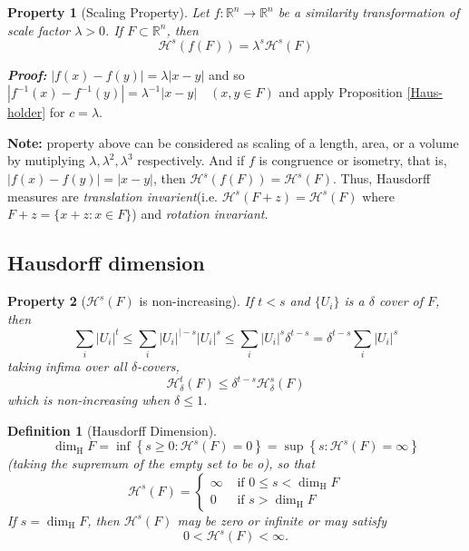 \documentclass[12pt, a4paper]{article}
\newtheorem{definition}{Definition}[subsection]
\newtheorem{property}{Property}[subsection]
\begin{document}
\begin{property}[Scaling Property]
    Let $f: \mathbb{R}^{n} \rightarrow \mathbb{R}^{n}$ be a similarity transformation of scale factor $\lambda>0$. If $F \subset \mathbb{R}^{n}$, then
$$
\mathcal{H}^{s}(f(F))=\lambda^{s} \mathcal{H}^{s}(F)
$$
\end{property}

\textbf{\textit{Proof:}} $|f(x)-f(y)|=\lambda|x-y|$ and so $\left|f^{-1}(x)-f^{-1}(y)\right|=\lambda^{-1}|x-y| \quad(x, y \in F)$ and apply Proposition \ref{Haus-holder} for $c=\lambda$.

\textbf{Note: } property above can be considered as scaling of a length, area, or a volume by mutiplying $\lambda, \lambda^2, \lambda^3$ respectively. And if $f$ is congruence or isometry, that is, $|f(x)-f(y)| = |x-y|$, then $\mathcal{H}^s(f(F)) = \mathcal{H}^s(F)$. 
Thus, Hausdorff measures are \textit{translation invarient}(i.e. $\mathcal{H}^s(F+z) = \mathcal{H}^s(F)$ where $F+z = \{x+z:x\in F\}$) and \textit{rotation invariant}. 
\newpage
\subsection{Hausdorff dimension}

\begin{property}[$\mathcal{H}^s(F)$ is non-increasing]
    If $t<s$ and $\{U_i\}$ is a $\delta$ cover of $F$, then
    $$
    \sum_{i}\left|U_{i}\right|^{t} \leq \sum_{i}\left|U_{i}\right|^{\mid-s}\left|U_{i}\right|^{s} \leq  \sum_{i}\left|U_{i}\right|^{s}\delta^{t-s} = \delta^{t-s} \sum_{i}\left|U_{i}\right|^{s}
    $$
    taking infima over all $\delta$-covers,
    $$
    \mathcal{H}^t_\delta(F)\leq \delta^{t-s}\mathcal{H}^s_\delta(F)
    $$
    which is non-increasing when $\delta\leq 1$.
\end{property}

\begin{definition}[Hausdorff Dimension]
    $$\operatorname{dim}_{\mathrm{H}} F=\inf \left\{s \geq 0: \mathcal{H}^{s}(F)=0\right\}=\sup \left\{s: \mathcal{H}^{s}(F)=\infty\right\}$$
(taking the supremum of the empty set to be o), so that
$$
\mathcal{H}^{s}(F)=\left\{\begin{array}{ll}
\infty & \text { if } 0 \leq s<\operatorname{dim}_{\mathrm{H}} F \\
0 & \text { if } s>\operatorname{dim}_{\mathrm{H}} F
\end{array}\right.
$$
If $s=\operatorname{dim}_{\mathrm{H}} F$, then $\mathcal{H}^{s}(F)$ may be zero or infinite or may satisfy
$$
0<\mathcal{H}^{s}(F)<\infty .
$$
\end{definition}
\end{document}
